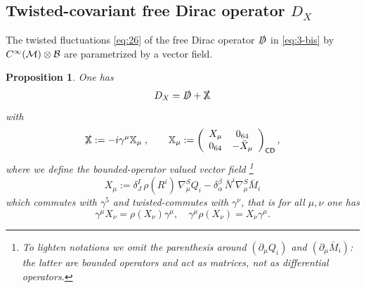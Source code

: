 \documentclass[11pt]{article}
\newcommand{\M}{\mathcal M}
\newcommand{\Ds}{\slashed D}
\newcommand{\del}{\partial}
\newcommand{\sC}{\mathsf C}
\newcommand{\sD}{\mathsf D}
\newtheorem{prop}{Proposition}[section]
\begin{document}
\subsection{Twisted-covariant free Dirac operator $D_X$}
\label{potenziale}
 The twisted fluctuations \eqref{eq:26} of the free Dirac operator
 $\Ds$ in \eqref{eq:3-bis} by 
  $C^\infty(\M)\otimes\cal B$ are parametrized by
 a vector field. 
\begin{prop}
\label{propdx}
 One has
  \begin{equation}
  \label{eq:132}
   D_X = \slashed D + \slashed{\mathbb  X} 
\end{equation}
with
  \begin{equation}
    \label{eq:192}
\slashed{\mathbb X}  :=  -i\gamma^\mu {\mathbb X}_\mu\;,
 \quad\quad
{\mathbb X}_\mu :=\left(
 \begin{array}{cc}
 X_\mu &0_{64} \\ 
  0_{64} & -
    \bar X_\mu
 \end{array}
\right)_{\sC\sD},
  \end{equation}
where we define the  bounded-operator valued vector field {\footnote{To lighten notations we
  omit the parenthesis around $(\del_\mu Q_i)$ and $(\del_\mu \bar M_i)$:
  the latter are bounded operators and act as matrices, not as
  differential operators.}} 
\begin{equation}
  \label{eq:127}
  X_\mu:=\delta^I_J\,\rho(R^i)\,\nabla^S_\mu Q_i - \delta_\alpha^\beta
  \,\bar N^i \nabla^S_\mu \bar  M_i\end{equation}
which commutes with $\gamma^5$ and twisted-commutes with $\gamma^\nu$,
that is for all $\mu,\nu$ one has
\begin{equation}
   \label{eq:76}
 \gamma^\mu X_\nu = \rho(X_\nu)\gamma^\mu,\quad
 \gamma^\mu\rho(X_\nu)=X_\nu\gamma^\mu.
 \end{equation}
\end{prop}
\end{document}
